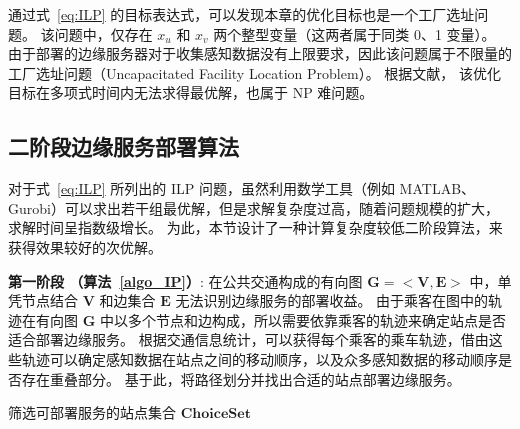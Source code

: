 通过式~\eqref{eq:ILP} 的目标表达式，可以发现本章的优化目标也是一个工厂选址问题。
该问题中，仅存在 $x_u$ 和 $x_v$ 两个整型变量（这两者属于同类 0、1 变量）。
由于部署的边缘服务器对于收集感知数据没有上限要求，因此该问题属于不限量的工厂选址问题（Uncapacitated Facility Location Problem）。
根据文献\cite{IGNACIO20081982}， 该优化目标在多项式时间内无法求得最优解，也属于 NP 难问题。

\subsection{二阶段边缘服务部署算法}

对于式~\eqref{eq:ILP} 所列出的 ILP 问题，虽然利用数学工具（例如 MATLAB、Gurobi）可以求出若干组最优解，但是求解复杂度过高，随着问题规模的扩大，求解时间呈指数级增长。
为此，本节设计了一种计算复杂度较低二阶段算法，来获得效果较好的次优解。

\textbf{第一阶段 （算法~\ref{algo_IP}）}:
在公共交通构成的有向图 $\boldsymbol{G}=<\boldsymbol{V}, \boldsymbol{E}>$ 中，单凭节点结合 $\boldsymbol{V}$ 和边集合 $\boldsymbol{E}$ 无法识别边缘服务的部署收益。
由于乘客在图中的轨迹在有向图 $\boldsymbol{G}$ 中以多个节点和边构成，所以需要依靠乘客的轨迹来确定站点是否适合部署边缘服务。
根据交通信息统计，可以获得每个乘客的乘车轨迹，借由这些轨迹可以确定感知数据在站点之间的移动顺序，以及众多感知数据的移动顺序是否存在重叠部分。
基于此，将路径划分并找出合适的站点部署边缘服务。

\begin{algorithm}[!b]
\setstretch{\algostretch}
\caption{筛选可部署服务的站点集合 $\boldsymbol{ChoiceSet}$}
\label{algo_IP}
\end{algorithm}

